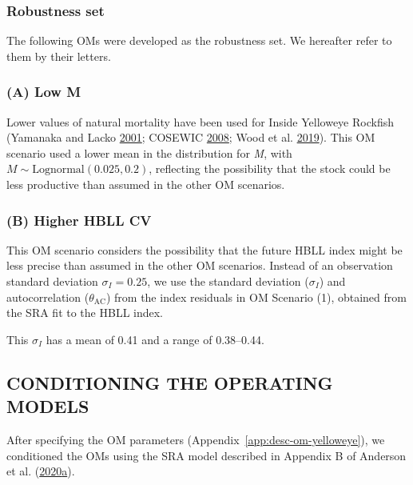 \documentclass[11pt]{book}
\begin{document}
\hypertarget{sec:approach3-robustness}{%
\subsubsection{Robustness set}\label{sec:approach3-robustness}}

The following OMs were developed as the robustness set. We hereafter refer to them by their letters.

\hypertarget{sec:approach3-referenceA}{%
\subsubsection{(A) Low M}\label{sec:approach3-referenceA}}

Lower values of natural mortality have been used for Inside Yelloweye Rockfish (Yamanaka and Lacko \protect\hyperlink{ref-yamanaka2001}{2001}; COSEWIC \protect\hyperlink{ref-cosewic2008}{2008}; Wood et al. \protect\hyperlink{ref-wood2019}{2019}). This OM scenario used a lower mean in the distribution for \emph{M}, with \(M \sim \textrm{Lognormal}(0.025, 0.2)\), reflecting the possibility that the stock could be less productive than assumed in the other OM scenarios.

\hypertarget{sec:approach3-referenceB}{%
\subsubsection{(B) Higher HBLL CV}\label{sec:approach3-referenceB}}

This OM scenario considers the possibility that the future HBLL index might be less precise than assumed in the other OM scenarios. Instead of an observation standard deviation \(\sigma_I = 0.25\), we use the standard deviation (\(\sigma_I\)) and autocorrelation (\(\theta_\textrm{AC}\)) from the index residuals in OM Scenario (1), obtained from the SRA fit to the HBLL index.

This \(\sigma_I\) has a mean of 0.41 and a range of 0.38--0.44.

\hypertarget{sec:approach3-conditioning}{%
\subsection{CONDITIONING THE OPERATING MODELS}\label{sec:approach3-conditioning}}

After specifying the OM parameters (Appendix~\ref{app:desc-om-yelloweye}), we conditioned the OMs using the SRA model described in Appendix B of Anderson et al. (\protect\hyperlink{ref-anderson2020gfmp}{2020}\protect\hyperlink{ref-anderson2020gfmp}{a}).
\end{document}
